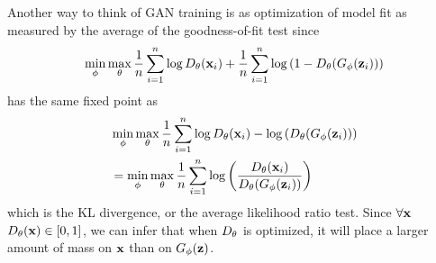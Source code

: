 Another way to think of GAN training is as optimization of model fit
as measured by the average of the goodness-of-fit test since
\begin{align}
  \min_\phi\max_\theta{1 \over n} \sum_{i=1}^n \log{D_\theta(\mathbf{x}_i)} + {1
    \over n} \sum_{i=1}^n\log{(1 - D_\theta(G_\phi(\mathbf{z}_i)))}
\end{align}
has the same fixed point as
\begin{align}
  & \min_\phi\max_\theta{1 \over n} \sum_{i=1}^n \log{D_\theta(\mathbf{x}_i)} - \log{(D_\theta(G_\phi(\mathbf{z}_i)))} \\
  & = \min_\phi\max_\theta{1 \over n} \sum_{i=1}^n \log{\left({D_\theta(\mathbf{x}_i) \over D_\theta(G_\phi(\mathbf{z}_i))}\right)}
\end{align}
which is the KL divergence, or the average likelihood ratio
test. Since $\forall \mathbf{x}$ $D_\theta(\mathbf{x}) \in [0, 1]$, we can infer that when
$D_\theta$ is optimized, it will place a larger amount of mass on $\mathbf{x}$ than
on $G_\phi(\mathbf{z})$.

